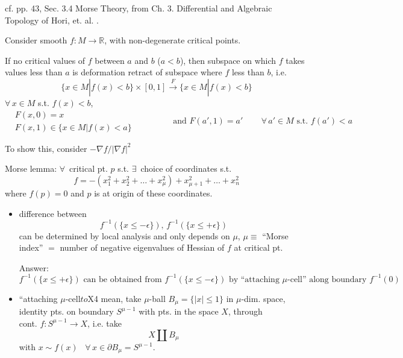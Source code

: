 \documentclass[10pt]{amsart}
\begin{document}
\begin{multicols*}{2}
cf. pp. 43, Sec. 3.4 Morse Theory, from Ch. 3. Differential and Algebraic Topology of Hori, et. al. \cite{Hori2003}.

Consider smooth $f:M \to \mathbb{R}$, with non-degenerate critical points.

If no critical values of $f$ between $a$ and $b$ ($a<b$), then subspace on which $f$ takes values less than $a$ is deformation retract of subspace where $f$ less than $b$, i.e.
\[
\lbrace x \in M | f(x) < b\rbrace \times [0,1] \xrightarrow{ F } \lbrace x \in M | f(x) < b\rbrace
\]
$\forall \, x \in M$ s.t. $f(x) < b$,
\[
\begin{aligned}
  & F(x,0)  = x \\
  & F(x,1) \in \lbrace x \in M | f(x) < a \rbrace 
  \end{aligned} \qquad \qquad \, \text{ and } F(a',1) = a' \qquad \, \forall \, a' \in M \text{ s.t. } f(a') < a
\]

To show this, consider $-\nabla f/|\nabla f|^2$

Morse lemma: $\forall \, $ critical pt. $p$ s.t. $\exists \, $ choice of coordinates s.t.
\begin{equation}
  f  = - (x_1^2 + x_2^2 + \dots + x_{\mu}^2) + x_{\mu + 1}^2 + \dots + x_n^2
\end{equation}
where $f(p)=0$ and $p$ is at origin of these coordinates.

\begin{itemize}
\item difference between
  \[
f^{-1}(\lbrace x \leq -\epsilon \rbrace) , \, f^{-1}(\lbrace x \leq + \epsilon \rbrace)
\]
can be determined by local analysis and only depends on $\mu$, $\mu \equiv $ ``Morse index'' $=$ number of negative eigenvalues of Hessian of $f$ at critical pt.

Answer: \\

\[
f^{-1}(\lbrace x \leq + \epsilon \rbrace) \text{ can be obtained from } f^{-1}(\lbrace x \leq -\epsilon \rbrace) \text{ by ``attaching $\mu$-cell'' along boundary $f^{-1}(0)$ }
\]

\item ``attaching $\mu$-cell$ to $X4 mean, take
  $\mu$-ball $B_{\mu} = \lbrace |x| \leq 1 \rbrace$ in $\mu$-dim. space, \\
  identity pts. on boundary $S^{\mu-1}$ with pts. in the space $X$, through \\
  cont. $f : S^{\mu-1} \to X$, i.e. take
  \[
X \coprod B_{\mu}
\]
with $x\sim f(x)$ \, $\forall \, x \in \partial B_{\mu} = S^{\mu -1}$.


\end{itemize}
\end{multicols*}
\end{document}
